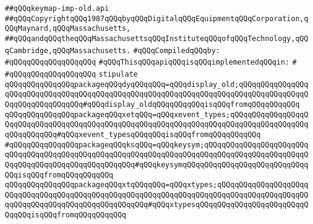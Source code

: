 \label{src/lib/x-kit/xclient/src/window/keymap-imp-old.api}
\verb|##qQQqkeymap-imp-old.api|\newline
\verb|##qQQqCopyrightqQQq1987qQQqbyqQQqDigitalqQQqEquipmentqQQqCorporation,qQQqMaynard,qQQqMassachusetts,|\newline
\verb|##qQQqandqQQqtheqQQqMassachusettsqQQqInstituteqQQqofqQQqTechnology,qQQqCambridge,qQQqMassachusetts.|\newline
\newline
\verb|#qQQqCompiledqQQqby:|\newline
\verb|#qQQqqQQqqQQqqQQqqQQq|\newline
\newline
\verb|#qQQqThisqQQqapiqQQqisqQQqimplementedqQQqin:|\newline
\verb|#|\newline
\verb|#qQQqqQQqqQQqqQQqqQQq|\newline
\newline
\verb|stipulate|\newline
\verb|qQQqqQQqqQQqqQQqpackageqQQqdyqQQqqQQq=qQQqdisplay_old;qQQqqQQqqQQqqQQqqQQqqQQqqQQqqQQqqQQqqQQqqQQqqQQqqQQqqQQqqQQqqQQqqQQqqQQqqQQqqQQqqQQqqQQqqQQqqQQqqQQqqQQq#qQQqdisplay_oldqQQqqQQqqQQqisqQQqfromqQQqqQQqqQQq|\newline
\verb|qQQqqQQqqQQqqQQqpackageqQQqxetqQQq=qQQqxevent_types;qQQqqQQqqQQqqQQqqQQqqQQqqQQqqQQqqQQqqQQqqQQqqQQqqQQqqQQqqQQqqQQqqQQqqQQqqQQqqQQqqQQqqQQqqQQqqQQqqQQq#qQQqxevent_typesqQQqqQQqisqQQqfromqQQqqQQqqQQq|\newline
\verb|#qQQqqQQqqQQqqQQqpackageqQQqksqQQq=qQQqkeysym;qQQqqQQqqQQqqQQqqQQqqQQqqQQqqQQqqQQqqQQqqQQqqQQqqQQqqQQqqQQqqQQqqQQqqQQqqQQqqQQqqQQqqQQqqQQqqQQqqQQqqQQqqQQqqQQqqQQqqQQqqQQq#qQQqkeysymqQQqqQQqqQQqqQQqqQQqqQQqqQQqqQQqisqQQqfromqQQqqQQqqQQq|\newline
\verb|qQQqqQQqqQQqqQQqpackageqQQqxtqQQqqQQq=qQQqxtypes;qQQqqQQqqQQqqQQqqQQqqQQqqQQqqQQqqQQqqQQqqQQqqQQqqQQqqQQqqQQqqQQqqQQqqQQqqQQqqQQqqQQqqQQqqQQqqQQqqQQqqQQqqQQqqQQqqQQqqQQqqQQq#qQQqxtypesqQQqqQQqqQQqqQQqqQQqqQQqqQQqqQQqisqQQqfromqQQqqQQqqQQq|\newline
